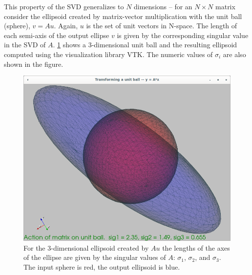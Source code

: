\documentclass[onefignum,onetabnum]{siamart190516}
\begin{document}
This property of the SVD generalizes to $N$ dimensions -- for an $N \times N$ matrix 
consider the ellipsoid created by matrix-vector multiplication with the unit ball (sphere), $v = A u$.
Again, $u$ is the set of unit vectors in N-space.
The length of each semi-axis of the
output ellipse $v$ is given by the corresponding singular value in the SVD
of $A$.   \cref{fig:3DEllipse} shows a 3-dimensional unit ball and the resulting
ellipsoid computed using the visualization library VTK.  The numeric values
of $\sigma_i$ are also shown in the figure.

\begin{figure}[H]
	\centering
	\includegraphics[width=0.8\columnwidth]{3DEllipse.png}
	\caption{
		For the 3-dimensional ellipsoid created by $A u$ the
		lengths of the axes of the ellipse
		are given by the singular values of $A$: $\sigma_1$, $\sigma_2$, and $\sigma_3$.
		The input sphere is red, the output ellipsoid is blue.}
	\label{fig:3DEllipse}
\end{figure}
\FloatBarrier 
\end{document}
